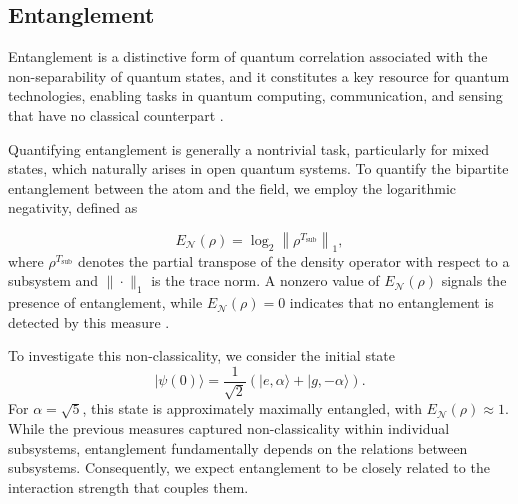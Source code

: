 \documentclass[aps,pre,superscriptaddress,twocolumn,10pt]{revtex4-2}
\begin{document}
\subsection{Entanglement}
\label{subsec:entanglement}
Entanglement is a distinctive form of quantum correlation associated with the non-separability of quantum states, and it constitutes a key resource for quantum technologies, enabling tasks in quantum computing, communication, and sensing that have no classical counterpart \cite{Horodecki2009, Browe2017, Sood2024}.

Quantifying entanglement is generally a nontrivial task, particularly for mixed states, which naturally arises in open quantum systems. To quantify the bipartite entanglement between the atom and the field, we employ the logarithmic negativity, defined as

\begin{equation}
    E_{\mathcal N}(\rho) = \log_2 \left\| \rho^{T_\text{sub}} \right\|_1 ,
    \label{eq:entanglement}
\end{equation}
where $\rho^{T_\text{sub}}$ denotes the partial transpose of the density operator with respect to a subsystem and $\|\cdot\|_1$ is the trace norm. 
A nonzero value of $E_{\mathcal N}(\rho)$ signals the presence of entanglement, 
while $E_{\mathcal N}(\rho)=0$ indicates that no entanglement is detected by this measure \cite{Vidal2002}. 

To investigate this non-classicality, we consider the initial state
\begin{equation} \label{eq:entangled}
    |\psi(0)\rangle=\frac{1}{\sqrt{2}}\left(|e,\alpha\rangle +|g,-\alpha\rangle\right).
\end{equation}
For $\alpha=\sqrt{5}$, this state is approximately maximally entangled, with $E_{\mathcal N}(\rho)\approx1$.
While the previous measures captured non-classicality within individual subsystems, entanglement fundamentally depends on the relations between subsystems. 
Consequently, we expect entanglement to be closely related to the interaction strength that couples them.
\end{document}
